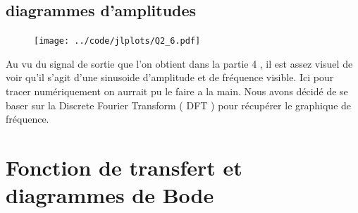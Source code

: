 \documentclass[11pt,a4paper]{article}
\begin{document}
\subsection{diagrammes d'amplitudes}
\begin{figure}[!h]
  \texttt{[image: ../code/jlplots/Q2\_6.pdf]}
  \caption{}\label{fig:}
\end{figure}

Au vu du signal de sortie que l'on obtient dans la partie 4 , il est assez visuel de voir qu'il s'agit d'une sinusoide d'amplitude et de fréquence visible.
Ici pour tracer numériquement on aurrait pu le faire a la main. Nous avons décidé de se baser sur la Discrete Fourier Transform ( DFT ) pour récupérer le graphique de fréquence.
\section{Fonction de transfert et diagrammes de Bode}
\end{document}
